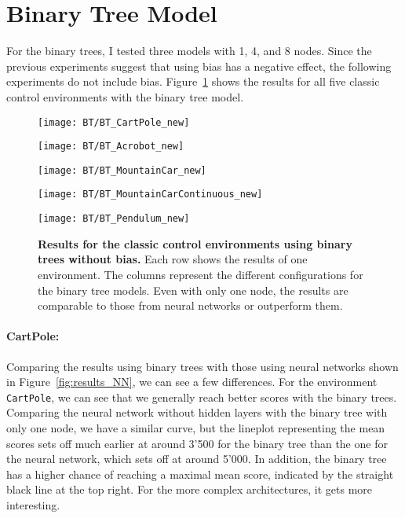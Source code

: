 \section{Binary Tree Model}
For the binary trees, I tested three models with 1, 4, and 8 nodes. Since the previous experiments suggest that using bias has a negative effect, the following experiments do not include bias. Figure~\ref{fig:results_BinaryTree} shows the results for all five classic control environments with the binary tree model.
\begin{figure}
  \centering
  \texttt{[image: BT/BT\_CartPole\_new]}

      \vspace{0.2cm}

  \texttt{[image: BT/BT\_Acrobot\_new]}

      \vspace{0.2cm}

  \texttt{[image: BT/BT\_MountainCar\_new]}

      \vspace{0.2cm}

  \texttt{[image: BT/BT\_MountainCarContinuous\_new]}

      \vspace{0.2cm}

  \texttt{[image: BT/BT\_Pendulum\_new]}
\caption[Results for the classic control environments using binary trees without bias]{
  \textbf{Results for the classic control environments using binary trees without bias.}
   Each row shows the results of one environment. The columns represent the different configurations for the binary tree models. Even with only one node, the results are comparable to those from neural networks or outperform them.
}
\label{fig:results_BinaryTree}
\end{figure}

\paragraph*{CartPole:} Comparing the results using binary trees with those using neural networks shown in Figure~\ref{fig:results_NN}, we can see a few differences. For the environment \verb|CartPole|, we can see that we generally reach  better scores with the binary trees. Comparing the neural network without hidden layers with the binary tree with only one node, we have a similar curve, but the lineplot representing the mean scores sets off much earlier at around 3'500 for the binary tree than the one for the neural network, which sets off at around 5'000. In addition, the binary tree has a higher chance of reaching a maximal mean score, indicated by the straight black line at the top right. For the more complex architectures, it gets more interesting.


